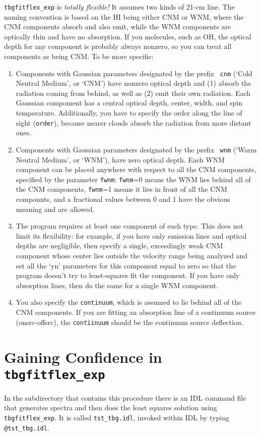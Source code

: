 \documentclass[preprint]{aastex}
\begin{document}
{\tt tbgfitflex\_exp} is {\it totally flexible!} It assumes two kinds of
21-cm line.  The naming convention is based on the HI being either CNM
or WNM, where the CNM components absorb and also emit, while the WNM
components are optically thin and have no absorption. If you molecules,
such as OH, the optical depth for any component is probably always
nonzero, so you can treat all components as being CNM. To be more
specific: \begin{enumerate}

\item Components with Gaussian parameters designated by the prefix {\tt
  cnm} (`Cold Neutral Medium', or `CNM') have nonzero optical depth and
  (1) absorb the radiation coming from behind, as well as (2) emit their
  own radiation. Each Gaussian compoment has a central optical depth,
  center, width, and spin temperature. Additionally, you have to specify
  the order along the line of sight ({\tt order}), because nearer clouds
  absorb the radiation from more distant ones.

\item Components with Gaussian parameters designated by the prefix {\tt
  wnm} (`Warm Neutral Medium', or `WNM'), have zero optical depth. Each WNM
  component can be placed anywhere with respect to all the CNM
  components, specified by the parameter {\tt fwnm}: {\tt fwnm}=0 means
  the WNM lies behind all of the CNM components, {\tt fwnm}=1 means it
  lies in front of all the CNM componnts, and a fractional values
  between 0 and 1 have the obvious meaning and are allowed.

\item The program requires at least one component of each type. This
  does not limit its flexibility: for example, 
if you have only emission lines and optical depths are negligible, then
specify a single, exceedingly weak CNM component whose center lies outside the velocity
range being analyzed and set all the `yn' parameters for this component
equal to zero so that the program doesn't try to least-squares fit the
component. If you have only absorption lines, then do the same for a
single WNM component.

\item You also specify the {\tt continuum}, which is assumed to lie behind all
of the CNM components. If you are fitting an absorption line of a
continuum source (onsrc-offsrc), the {\tt contiinuum} should be the
continuum source deflection.
\end{enumerate}

\section{Gaining Confidence in {\tt tbgfitflex\_exp}}

In the subdirectory that contains this procedure there is an IDL command
file that generates spectra and then does the least squares solution
using {\tt tbgfitflex\_exp}. It is called {\tt tst\_tbg.idl}, invoked
within IDL by typing {\tt @tst\_tbg.idl}. 
\end{document}
